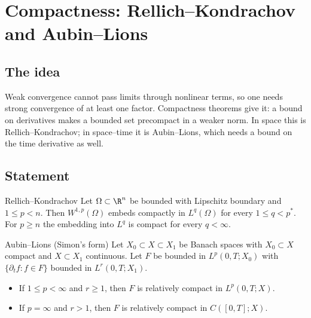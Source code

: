 
\section{Compactness: Rellich--Kondrachov and Aubin--Lions}\label{p:compactness}


\subsection*{The idea}

Weak convergence cannot pass limits through nonlinear terms, so one needs strong convergence of at least one factor. Compactness theorems give it: a bound on derivatives makes a bounded set precompact in a weaker norm. In space this is Rellich--Kondrachov; in space--time it is Aubin--Lions, which needs a bound on the time derivative as well.

\subsection*{Statement}

\begin{thmbox}{Rellich--Kondrachov}
Let $\Omega\subset\R^n$ be bounded with Lipschitz boundary and $1\le p< n$. Then $W^{1,p}(\Omega)$ embeds compactly in $L^q(\Omega)$ for every $1\le q< p^*$. For $p\ge n$ the embedding into $L^q$ is compact for every $q< \infty$.
\end{thmbox}

\begin{thmbox}{Aubin--Lions (Simon's form)}
Let $X_0\subset X\subset X_1$ be Banach spaces with $X_0\subset X$ compact and $X\subset X_1$ continuous. Let $F$ be bounded in $L^p(0,T;X_0)$ with $\{\partial_t f: f\in F\}$ bounded in $L^r(0,T;X_1)$.

\begin{itemize}
\item If $1\le p< \infty$ and $r\ge1$, then $F$ is relatively compact in $L^p(0,T;X)$.
\item If $p=\infty$ and $r> 1$, then $F$ is relatively compact in $C([0,T];X)$.
\end{itemize}
\end{thmbox}


